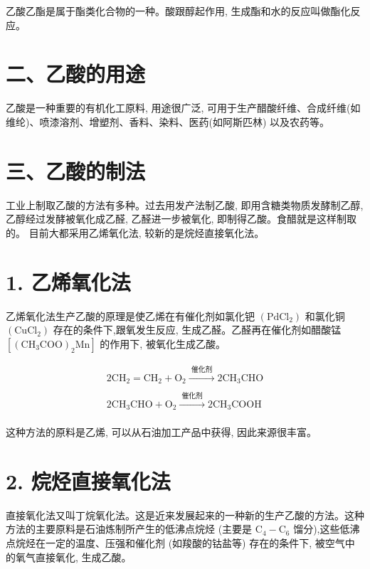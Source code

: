 \documentclass[10pt]{article}
\begin{document}
乙酸乙酯是属于酯类化合物的一种。酸跟醇起作用, 生成酯和水的反应叫做酯化反应。

\section*{二、乙酸的用途}

乙酸是一种重要的有机化工原料, 用途很广泛, 可用于生产醋酸纤维、合成纤维(如维纶)、喷漆溶剂、增塑剂、香料、染料、医药(如阿斯匹林) 以及农药等。

\section*{三、乙酸的制法}

工业上制取乙酸的方法有多种。过去用发产法制乙酸, 即用含糖类物质发酵制乙醇, 乙醇经过发酵被氧化成乙醛, 乙醛进一步被氧化, 即制得乙酸。食醋就是这样制取的。 目前大都采用乙烯氧化法, 较新的是烷烃直接氧化法。

\section*{1. 乙烯氧化法}

乙烯氧化法生产乙酸的原理是使乙烯在有催化剂如氯化钯 \(\left( {\mathrm{{PdCl}}}_{2}\right)\) 和氯化铜 \(\left( {\mathrm{{CuCl}}}_{2}\right)\) 存在的条件下,跟氧发生反应, 生成乙醛。乙醛再在催化剂如醋酸锰 \(\left\lbrack {{\left( {\mathrm{{CH}}}_{3}\mathrm{{COO}}\right) }_{2}\mathrm{{Mn}}}\right\rbrack\) 的作用下, 被氧化生成乙酸。

\[
\begin{matrix} 2{\mathrm{{CH}}}_{2} = {\mathrm{{CH}}}_{2} + {\mathrm{O}}_{2}\xrightarrow[]{\text{ 催化剂 }}2{\mathrm{{CH}}}_{3}\mathrm{{CHO}} \\ 2{\mathrm{{CH}}}_{3}\mathrm{{CHO}} + {\mathrm{O}}_{2}\xrightarrow[]{\text{ 催化剂 }}2{\mathrm{{CH}}}_{3}\mathrm{{COOH}} \end{matrix}
\]

这种方法的原料是乙烯, 可以从石油加工产品中获得, 因此来源很丰富。

\section*{2. 烷烃直接氧化法}

直接氧化法又叫丁烷氧化法。这是近来发展起来的一种新的生产乙酸的方法。这种方法的主要原料是石油炼制所产生的低沸点烷烃 (主要是 \({\mathrm{C}}_{4} - {\mathrm{C}}_{6}\) 馏分),这些低沸点烷烃在一定的温度、压强和催化剂 (如羧酸的钴盐等) 存在的条件下, 被空气中的氧气直接氧化, 生成乙酸。
\end{document}
